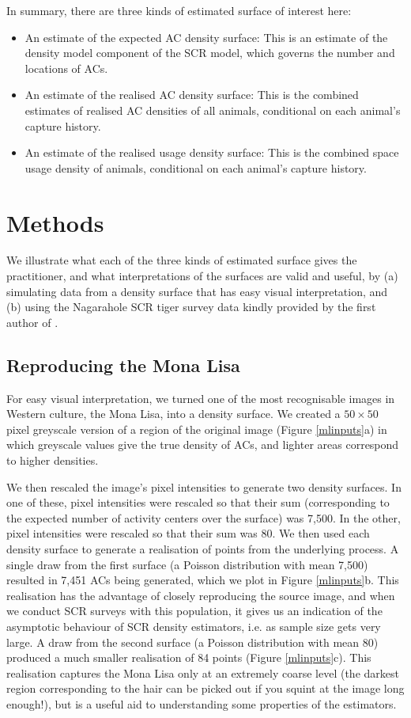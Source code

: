 \documentclass[10pt,a4paper]{article}
\begin{document}
In summary, there are three kinds of estimated surface of interest here: 
\begin{itemize}
\item An estimate of the expected AC density surface: This is an estimate of the density model component of the SCR model, which governs the number and locations of ACs.
\item An estimate of the realised AC density surface: This is the combined estimates of realised AC densities of all animals, conditional on each animal's capture history.
\item An estimate of the realised usage density surface:  This is the combined space usage density of animals, conditional on each animal's capture history.
\end{itemize}

\section{Methods}

We illustrate what each of the three kinds of estimated surface gives the practitioner, and what interpretations of the surfaces are valid and useful, by (a) simulating data from a density surface that has easy visual interpretation, and (b) using the Nagarahole SCR tiger survey data kindly provided by the first author of \cite{Dorazio+Karanth:17}.

\subsection{Reproducing the Mona Lisa} \label{monalisa}

For easy visual interpretation, we turned one of the most recognisable images in Western culture, the Mona Lisa, into a density surface. We created a $50 \times 50$ pixel greyscale version of a region of the original image (Figure \ref{mlinputs}a) in which greyscale values give the true density of ACs, and lighter areas correspond to higher densities.

We then rescaled the image's pixel intensities to generate two density surfaces. In one of these, pixel intensities were rescaled so that their sum (corresponding to the expected number of activity centers over the surface) was 7,500. In the other, pixel intensities were rescaled so that their sum was 80. We then used each density surface to generate a realisation of points from the underlying process. A single draw from the first surface (a Poisson distribution with mean 7,500) resulted in 7,451 ACs being generated, which we plot in Figure \ref{mlinputs}b. This realisation has the advantage of closely reproducing the source image, and when we conduct SCR surveys with this population, it gives us an indication of the asymptotic behaviour of SCR density estimators, i.e. as sample size gets very large. A draw from the second surface (a Poisson distribution with mean 80) produced a much smaller realisation of 84 points (Figure \ref{mlinputs}c). This realisation captures the Mona Lisa only at an extremely coarse level (the darkest region corresponding to the hair can be picked out if you squint at the image long enough!), but is a useful aid to understanding some properties of the estimators.
\end{document}
